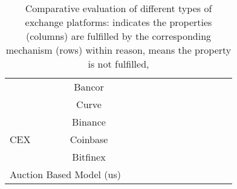 \begin{table}[t]
\begin{tabular}{|l|c|p{0.4cm}|p{0.4cm}|p{0.4cm}|p{0.4cm}|p{0.4cm}|p{0.4cm}|p{0.4cm}|p{0.4cm}|p{0.4cm}|p{0.4cm}|p{0.4cm}|}
							                      	&Bancor			& 						&						&						&						&						&						&						&						&						& 						&						\\
										       &Curve     		& 						&						&						&						&						&						&						&						&						& 						&						\\ \hline			
\multirow{3}{*}{CEX}    							&Binance		&\multirow{3}{*}{\prt}		&\multirow{3}{*}{\prt}		&\multirow{3}{*}{\full}		&\multirow{3}{*}{\full}		&\multirow{3}{*}{\full}		&\multirow{3}{*}{\full} 		&\multirow{3}{*}{\full}		&\multirow{3}{*}{\prt}		&\multirow{3}{*}{\prt}		&\multirow{3}{*}{\prt }		&\multirow{3}{*}{\full } 		\\ 
							                      	&Coinbase		& 						&						&						&						&						&						&						&						&						& 						&						\\
										       &Bitfinex     		& 						&						&						&						&						&						&						&						&						& 						&						\\ \hline	
\multicolumn{2}{|c|}{Auction Based Model (us)}       & 						&						&						&						&						&						&						&						&						& 						&						\\ \hline

\end{tabular}
\caption{\footnotesize{Comparative evaluation of different types of exchange platforms: {\full} indicates the properties (columns) are fulfilled by the corresponding mechanism (rows) within reason, {\prt} means the property is not fulfilled, }
\label{tab:eval}}
\end{table}

	